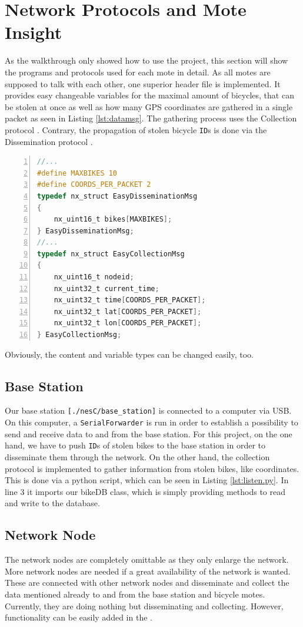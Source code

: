 \documentclass[a4paper]{article}
\begin{document}
\section{Network Protocols and Mote Insight}\label{sec:insight}%
As the walkthrough only showed how to use the project, this section will show the programs and protocols used for each mote in detail. As all motes are supposed to talk with each other, one superior header file is implemented. It provides easy changeable variables for the maximal amount of bicycles, that can be stolen at once as well as how many GPS coordinates are gathered in a single packet as seen in Listing \ref{lst:datamsg}. The gathering process uses the Collection protocol \cite{colldiss}. Contrary, the propagation of stolen bicycle \texttt{ID}s is done via the Dissemination protocol \cite{colldiss}. 
\begin{lstlisting}[numbers=left, frame=single,language=C, captionpos=b, caption={DataMsg.h, content of packets}, label=lst:datamsg]
//...
#define MAXBIKES 10
#define COORDS_PER_PACKET 2
typedef nx_struct EasyDisseminationMsg 
{
    nx_uint16_t bikes[MAXBIKES];
} EasyDisseminationMsg;
//...
typedef nx_struct EasyCollectionMsg 
{
    nx_uint16_t nodeid;
    nx_uint32_t current_time;
    nx_uint32_t time[COORDS_PER_PACKET];
    nx_uint32_t lat[COORDS_PER_PACKET];
    nx_uint32_t lon[COORDS_PER_PACKET];
} EasyCollectionMsg;
\end{lstlisting}
Obviously, the content and variable types can be changed easily, too.
\subsection{Base Station}
Our base station \texttt{[./nesC/base\_station]} is connected to a computer via USB. On this computer, a \texttt{SerialForwarder} is run in order to establish a possibility to send and receive data to and from the base station. For this project, on the one hand, we have to push \texttt{ID}s of stolen bikes to the base station in order to disseminate them through the network. On the other hand, the collection protocol is implemented to gather information from stolen bikes, like coordinates. This is done via a python script, which can be seen in Listing \ref{lst:listen.py}. In line 3 it imports our bikeDB class, which is simply providing methods to read and write to the database.\\

\subsection{Network Node}
The network nodes are completely omittable as they only enlarge the network. More network nodes are needed if a great availability of the network is wanted. These are connected with other network nodes and disseminate and collect the data mentioned already to and from the base station and bicycle motes. Currently, they are doing nothing but disseminating and collecting. However, functionality can be easily added in the \texttt{}.
\end{document}
